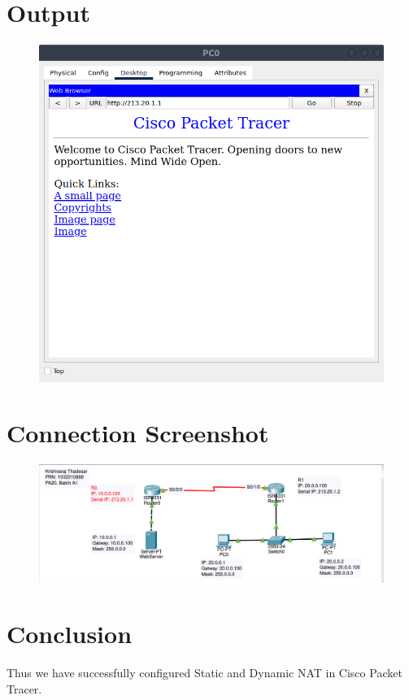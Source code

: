 \documentclass[11pt]{article}
\begin{document}
\section{Output}
\begin{figure}[H]
	\centering
	\includegraphics[scale=0.6]{../Screenshots/Natting web browser.png}
\end{figure}

\section{Connection Screenshot}


\begin{figure}[H]
	\centering
	\includegraphics[scale=0.4]{../Screenshots/Assignment_6_screenshot.png}
\end{figure}


\section{Conclusion}
Thus we have successfully configured Static and Dynamic NAT in Cisco Packet Tracer.
\end{document}
